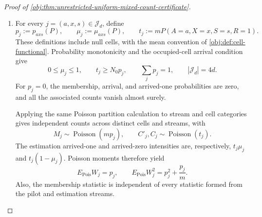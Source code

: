 \begin{proof}[Proof of \cref{obj:thm:unrestricted-uniform-mixed-count-certificate}]
\begin{enumerate}
For the capped auxiliary output, conditional averaging gives
\[
\begin{aligned}
&E_\omega\!\left[
(\widetilde\tau(\mathbf O_n;\omega)-\Phi(P))^2
\mid\mathbf O_n\right]\\
&\quad=
(\widehat\tau^{\mathrm{mix}}_{n,d,q}(\mathbf O_n)-\Phi(P))^2
+
E_\omega\!\left[
(\widetilde\tau(\mathbf O_n;\omega)
-\widehat\tau^{\mathrm{mix}}_{n,d,q}(\mathbf O_n))^2
\mid\mathbf O_n\right].
\end{aligned}
\]
On each prefix-count fibre \(\nu\le n\), its stream law agrees with the
corresponding uncapped law. Summing these fibres, discarding the
nonnegative uncapped loss on the remaining fibres, and bounding the
overflow loss by four yields
\[
E_P\!\left[
(\widehat\tau^{\mathrm{mix}}_{n,d,q}-\Phi(P))^2
\right]
\le
E_{\mathrm{Pois}}\!\left[
(\widetilde\tau_{\mathrm{Pois}}-\Phi(P))^2
\right]+4\Pr(K_0>n).
\]
The Poisson probability series evaluates the exponential moment as
\[
E[2^{K_0}]
=e^{-n/2}\sum_{\nu=0}^{\infty}\frac{n^\nu}{\nu!}
=e^{n/2}.
\]
Since \(\{K_0>n\}\subseteq\{2^{K_0}\ge2^n\}\), exponential Markov gives
\[
\Pr(K_0>n)
\le\Pr(2^{K_0}\ge2^n)
\le2^{-n}E[2^{K_0}]
=e^{-n\log2+n/2}.
\]
Multiplying by \(e^{-n/2}\) cancels the intensity factor, so
\[
\Pr(K_0>n)e^{-n/2}
\le e^{-n\log2},
\qquad
\Pr(K_0>n)\le e^{-n\gamma_0}.
\]
Consequently,
\[
E_P\!\left[
(\widehat\tau^{\mathrm{mix}}_{n,d,q}-\Phi(P))^2
\right]
\le
E_{\mathrm{Pois}}\!\left[
(\widetilde\tau_{\mathrm{Pois}}-\Phi(P))^2
\right]+4e^{-n\gamma_0}.
\]
All these expectations are well defined; the capped sample space is finite
and the clipped outputs are bounded.

\item For every \(j=(a,x,s)\in\mathcal J_d\), define
\[
p_j:=p_{axs}(P),\qquad
\mu_j:=\mu_{axs}(P),\qquad
t_j:=mP(A=a,X=x,S=s,R=1).
\]
These definitions include null cells, with the mean convention of
\cref{obj:def:cell-functional}. Probability monotonicity and the
occupied-cell arrival condition give
\[
0\le\mu_j\le1,\qquad
t_j\ge N_0p_j,\qquad
\sum_jp_j=1,\qquad |\mathcal J_d|=4d.
\]
For \(p_j=0\), the membership, arrival, and arrived-one probabilities are
zero, and all the associated counts vanish almost surely.

Applying the same Poisson partition calculation to stream and cell
categories gives independent counts across distinct cells and streams,
with
\[
M_j\sim\operatorname{Poisson}(mp_j),
\qquad
C'_j,C_j\sim\operatorname{Poisson}(t_j).
\]
The estimation arrived-one and arrived-zero intensities are, respectively,
\(t_j\mu_j\) and \(t_j(1-\mu_j)\). Poisson moments therefore yield
\[
E_{\mathrm{Pois}}W_j=p_j,\qquad
E_{\mathrm{Pois}}W_j^2=p_j^2+\frac{p_j}{m}.
\]
Also, the membership statistic is independent of every statistic formed
from the pilot and estimation streams.


\end{enumerate}
\end{proof}
